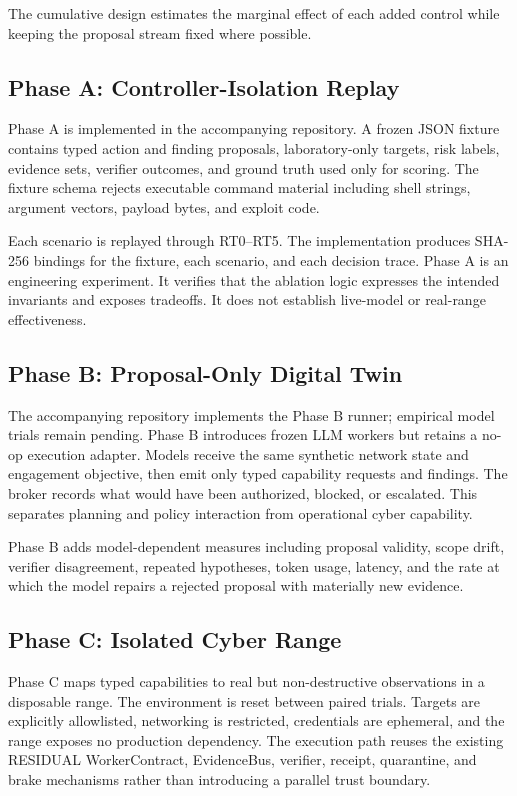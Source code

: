 \documentclass[conference]{IEEEtran}
\begin{document}
The cumulative design estimates the marginal effect of each added control while keeping the proposal stream fixed where possible.

\subsection{Phase A: Controller-Isolation Replay}
Phase A is implemented in the accompanying repository. A frozen JSON fixture contains typed action and finding proposals, laboratory-only targets, risk labels, evidence sets, verifier outcomes, and ground truth used only for scoring. The fixture schema rejects executable command material including shell strings, argument vectors, payload bytes, and exploit code.

Each scenario is replayed through RT0--RT5. The implementation produces SHA-256 bindings for the fixture, each scenario, and each decision trace. Phase A is an engineering experiment. It verifies that the ablation logic expresses the intended invariants and exposes tradeoffs. It does not establish live-model or real-range effectiveness.

\subsection{Phase B: Proposal-Only Digital Twin}
The accompanying repository implements the Phase B runner; empirical model trials remain pending. Phase B introduces frozen LLM workers but retains a no-op execution adapter. Models receive the same synthetic network state and engagement objective, then emit only typed capability requests and findings. The broker records what would have been authorized, blocked, or escalated. This separates planning and policy interaction from operational cyber capability.

Phase B adds model-dependent measures including proposal validity, scope drift, verifier disagreement, repeated hypotheses, token usage, latency, and the rate at which the model repairs a rejected proposal with materially new evidence.

\subsection{Phase C: Isolated Cyber Range}
Phase C maps typed capabilities to real but non-destructive observations in a disposable range. The environment is reset between paired trials. Targets are explicitly allowlisted, networking is restricted, credentials are ephemeral, and the range exposes no production dependency. The execution path reuses the existing RESIDUAL WorkerContract, EvidenceBus, verifier, receipt, quarantine, and brake mechanisms rather than introducing a parallel trust boundary.
\end{document}
